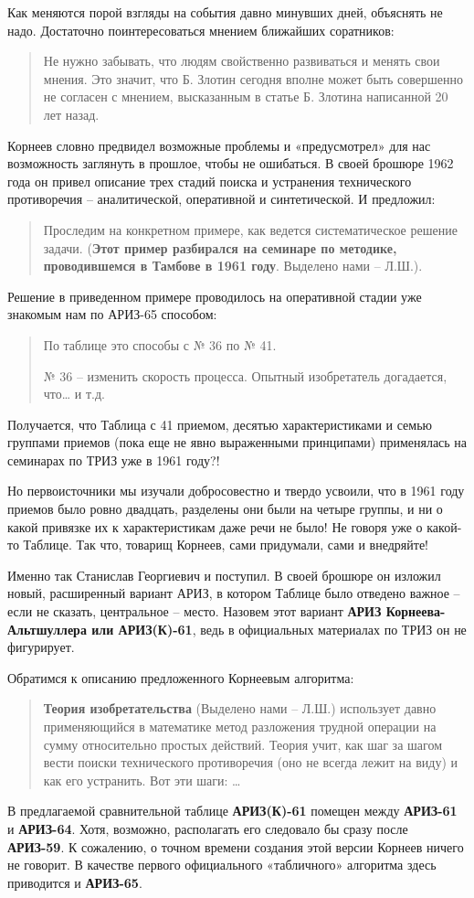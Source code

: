 \documentclass[11pt,a4paper]{article}
\begin{document}
Как меняются порой взгляды на события давно минувших дней, объяснять не надо.
Достаточно поинтересоваться мнением ближайших соратников:
\begin{quote}
  Не нужно забывать, что людям свойственно развиваться и менять свои мнения.
  Это значит, что Б. Злотин сегодня вполне может быть совершенно не согласен с
  мнением, высказанным в статье Б. Злотина написанной 20 лет назад.
  \cite{ZlotinZusmanNN}
\end{quote}
Корнеев словно предвидел возможные проблемы и «предусмотрел» для нас
возможность заглянуть в прошлое, чтобы не ошибаться. В своей брошюре 1962 года
\cite{Korneev1962} он привел описание трех стадий поиска и устранения
технического противоречия -- аналитической, оперативной и синтетической. И
предложил:
\begin{quote}
  Проследим на конкретном примере, как ведется систематическое решение задачи.
  (\textbf{Этот пример разбирался на семинаре по методике, проводившемся в
    Тамбове в 1961 году}. Выделено нами -- Л.Ш.).
\end{quote}
Решение в приведенном примере проводилось на оперативной стадии уже знакомым
нам по АРИЗ-65 способом:
\begin{quote}
  По таблице это способы с № 36 по № 41.

  № 36 -- изменить скорость процесса. Опытный изобретатель догадается, что… и
  т.д.
\end{quote}
Получается, что Таблица с 41 приемом, десятью характеристиками и семью
группами приемов (пока еще не явно выраженными принципами) применялась на
семинарах по ТРИЗ уже в 1961 году?!

Но первоисточники мы изучали добросовестно и твердо усвоили, что в 1961 году
приемов было ровно двадцать, разделены они были на четыре группы, и ни о какой
привязке их к характеристикам даже речи не было! Не говоря уже о какой-то
Таблице. Так что, товарищ Корнеев, сами придумали, сами и внедряйте!

Именно так Станислав Георгиевич и поступил. В своей брошюре он изложил новый,
расширенный вариант АРИЗ, в котором Таблице было отведено важное -- если не
сказать, центральное -- место. Назовем этот вариант \textbf{АРИЗ
  Корнеева-Альтшуллера или АРИЗ(К)-61}, ведь в официальных материалах по ТРИЗ
он не фигурирует.

Обратимся к описанию предложенного Корнеевым алгоритма:
\begin{quote}
  \textbf{Теория изобретательства} (Выделено нами -- Л.Ш.) использует давно
  применяющийся в математике метод разложения трудной операции на сумму
  относительно простых действий. Теория учит, как шаг за шагом вести поиски
  технического противоречия (оно не всегда лежит на виду) и как его устранить.
  Вот эти шаги: …
\end{quote}
В предлагаемой сравнительной таблице \cite{Shub2006} \textbf{АРИЗ(К)-61}
помещен между \textbf{АРИЗ-61} и \textbf{АРИЗ-64}. Хотя, возможно, располагать
его следовало бы сразу после \textbf{АРИЗ-59}. К сожалению, о точном времени
создания этой версии Корнеев ничего не говорит. В качестве первого
официального «табличного» алгоритма здесь приводится и \textbf{АРИЗ-65}.
\end{document}
